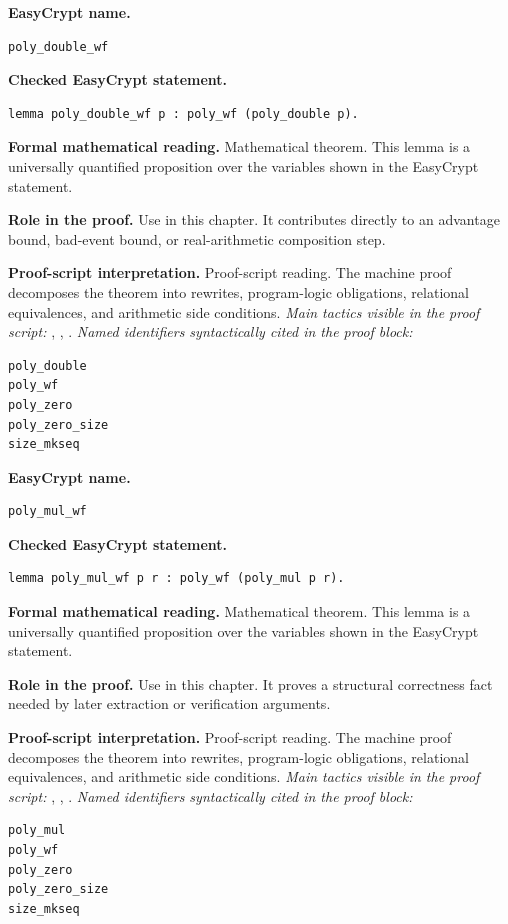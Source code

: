 \begin{formaltheorem}
\noindent\textbf{EasyCrypt name.}
\begin{lstlisting}[language=EasyCrypt,basicstyle=\ttfamily\scriptsize]
poly_double_wf
\end{lstlisting}
\noindent\textbf{Checked EasyCrypt statement.}
\begin{lstlisting}[language=EasyCrypt,basicstyle=\ttfamily\scriptsize]
lemma poly_double_wf p : poly_wf (poly_double p).
\end{lstlisting}
\noindent\textbf{Formal mathematical reading.}
Mathematical theorem. This lemma is a universally quantified proposition over the variables shown in the EasyCrypt statement.

\noindent\textbf{Role in the proof.}
Use in this chapter. It contributes directly to an advantage bound, bad-event bound, or real-arithmetic composition step.

\noindent\textbf{Proof-script interpretation.}
Proof-script reading. The machine proof decomposes the theorem into rewrites, program-logic obligations, relational equivalences, and arithmetic side conditions.
\emph{Main tactics visible in the proof script:} , , .
\emph{Named identifiers syntactically cited in the proof block:}
\begin{lstlisting}[language=EasyCrypt,basicstyle=\ttfamily\scriptsize]
poly_double
poly_wf
poly_zero
poly_zero_size
size_mkseq
\end{lstlisting}

\end{formaltheorem}

\begin{formaltheorem}
\noindent\textbf{EasyCrypt name.}
\begin{lstlisting}[language=EasyCrypt,basicstyle=\ttfamily\scriptsize]
poly_mul_wf
\end{lstlisting}
\noindent\textbf{Checked EasyCrypt statement.}
\begin{lstlisting}[language=EasyCrypt,basicstyle=\ttfamily\scriptsize]
lemma poly_mul_wf p r : poly_wf (poly_mul p r).
\end{lstlisting}
\noindent\textbf{Formal mathematical reading.}
Mathematical theorem. This lemma is a universally quantified proposition over the variables shown in the EasyCrypt statement.

\noindent\textbf{Role in the proof.}
Use in this chapter. It proves a structural correctness fact needed by later extraction or verification arguments.

\noindent\textbf{Proof-script interpretation.}
Proof-script reading. The machine proof decomposes the theorem into rewrites, program-logic obligations, relational equivalences, and arithmetic side conditions.
\emph{Main tactics visible in the proof script:} , , .
\emph{Named identifiers syntactically cited in the proof block:}
\begin{lstlisting}[language=EasyCrypt,basicstyle=\ttfamily\scriptsize]
poly_mul
poly_wf
poly_zero
poly_zero_size
size_mkseq
\end{lstlisting}

\end{formaltheorem}

